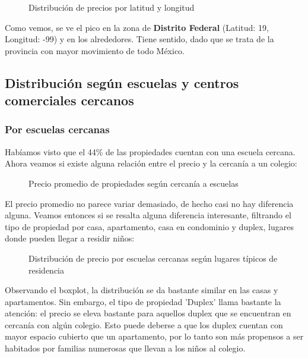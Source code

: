 \documentclass[
10pt, %
a4paper, %
oneside, %
headinclude,footinclude, %
BCOR5mm, %
]{scrartcl}
\begin{document}
    \begin{figure}[H]
        \caption{Distribuci\'on de precios por latitud y longitud}
        \label{fig:precio-distribucion-latlng}
    \end{figure}
    
    Como vemos, se ve el pico en la zona de \textbf{Distrito Federal} (Latitud: 19, Longitud: -99) y en los alrededores. Tiene sentido, dado que se trata de la provincia con mayor movimiento de todo M\'exico.
    
\newpage    
\subsection{Distribución según escuelas y centros comerciales cercanos}
    \subsubsection{Por escuelas cercanas}
    Habíamos visto que el 44\% de las propiedades cuentan con una escuela cercana. Ahora veamos si existe alguna relación entre el precio y la cercanía a un colegio:
    
    \begin{figure}[H]
        \caption{Precio promedio de propiedades según cercanía a escuelas}
        \label{fig:precio-escuelas-cercanas-todas-las-prop}
    \end{figure}
   
   El precio promedio no parece variar demasiado, de hecho casi no hay diferencia alguna. Veamos entonces si se resalta alguna diferencia interesante, filtrando el tipo de propiedad por casa, apartamento, casa en condominio y duplex, lugares donde pueden llegar a residir niños:
   
       \begin{figure}[H]
        \caption{Distribución de precio por escuelas cercanas según lugares típicos de residencia}
        \label{fig:precio-escuelas-cercanas-por-prop}
    \end{figure}
  
  Observando el boxplot, la distribución se da bastante similar en las casas y apartamentos. Sin embargo, el tipo de propiedad 'Duplex' llama bastante la atención: el precio se eleva bastante para aquellos duplex que se encuentran en cercanía con algún colegio. Esto puede deberse a que los duplex cuentan con mayor espacio cubierto que un apartamento, por lo tanto son más propensos a ser habitados por familias numerosas que llevan a los niños al colegio.
  
\end{document}
